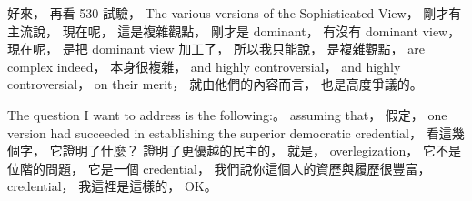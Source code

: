\hypertarget{w02:cue:2140}{}好來，
\hypertarget{w02:cue:2141}{}再看 530 試驗，
\hypertarget{w02:cue:2142}{}The various versions of the Sophisticated View，
\hypertarget{w02:cue:2143}{}剛才有主流說，
\hypertarget{w02:cue:2144}{}現在呢，
\hypertarget{w02:cue:2145}{}這是複雜觀點，
\hypertarget{w02:cue:2146}{}剛才是 dominant，
\hypertarget{w02:cue:2147}{}有沒有 dominant view，
\hypertarget{w02:cue:2148}{}現在呢，
\hypertarget{w02:cue:2149}{}是把 dominant view 加工了，
\hypertarget{w02:cue:2150}{}所以我只能說，
\hypertarget{w02:cue:2151}{}是複雜觀點，
\hypertarget{w02:cue:2152}{}are complex indeed，
\hypertarget{w02:cue:2153}{}本身很複雜，
\hypertarget{w02:cue:2154}{}and highly controversial，
\hypertarget{w02:cue:2155}{}and highly controversial，
\hypertarget{w02:cue:2156}{}on their merit，
\hypertarget{w02:cue:2157}{}就由他們的內容而言，
\hypertarget{w02:cue:2158}{}也是高度爭議的。

\hypertarget{w02:cue:2159}{}The question I want to address is the following:。
\hypertarget{w02:cue:2160}{}assuming that，
\hypertarget{w02:cue:2161}{}假定，
\hypertarget{w02:cue:2162}{}one version had succeeded in establishing the superior democratic credential，
\hypertarget{w02:cue:2163}{}看這幾個字，
\hypertarget{w02:cue:2164}{}它證明了什麼？
\hypertarget{w02:cue:2165}{}證明了更優越的民主的，
\hypertarget{w02:cue:2166}{}就是，
\hypertarget{w02:cue:2167}{}overlegization，
\hypertarget{w02:cue:2168}{}它不是位階的問題，
\hypertarget{w02:cue:2169}{}它是一個 credential，
\hypertarget{w02:cue:2170}{}我們說你這個人的資歷與履歷很豐富，
\hypertarget{w02:cue:2171}{}credential，
\hypertarget{w02:cue:2172}{}我這裡是這樣的，
\hypertarget{w02:cue:2173}{}OK。

